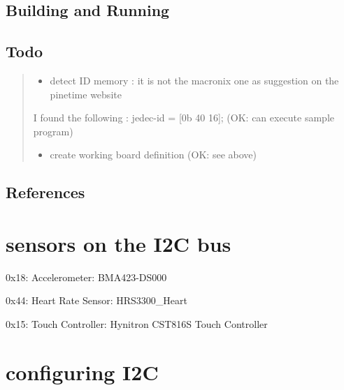 \documentclass[letterpaper,10pt,english]{sphinxmanual}
\begin{document}
\section{Building and Running}
\label{\detokenize{spinor:building-and-running}}
\begin{sphinxVerbatim}[commandchars=\\\{\}]
\end{sphinxVerbatim}


\section{Todo}
\label{\detokenize{spinor:todo}}\begin{quote}
\begin{itemize}
\item {} 
detect ID memory  : it is not the macronix one as suggestion on the pinetime website

\end{itemize}

I found the following : jedec-id = {[}0b 40 16{]}; (OK: can execute sample program)
\begin{itemize}
\item {} 
create working board definition (OK: see above)

\end{itemize}
\end{quote}


\section{References}
\label{\detokenize{spinor:references}}


\chapter{sensors on the I2C bus}
\label{\detokenize{sensors:sensors-on-the-i2c-bus}}\label{\detokenize{sensors::doc}}
0x18: Accelerometer: BMA423-DS000

0x44: Heart Rate Sensor: HRS3300\_Heart

0x15: Touch Controller: Hynitron CST816S Touch Controller


\chapter{configuring I2C}
\label{\detokenize{i2c:configuring-i2c}}\label{\detokenize{i2c::doc}}
\end{document}
